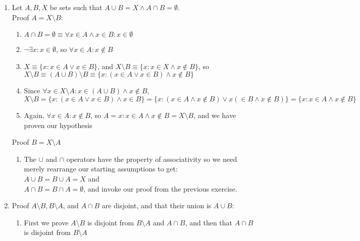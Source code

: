 \documentclass{article}
\begin{document}
\begin{enumerate}
\begin{enumerate}
            \end{enumerate}
        \item Let $A, B, X$ be sets such that $A \cup B = X \land A \cap B = \emptyset$. \\
            Proof $A = X \setminus B$:
            \begin{enumerate}
                \item $A \cap B = \emptyset \equiv \forall x \in A \land x \in B: x \in \emptyset$
                \item $\neg\exists x : x \in \emptyset$, so $\forall x \in A: x \notin B$
                \item $X \equiv \{x : x \in A \lor x \in B\}$, and $X \setminus B \equiv \{x : x \in X \land x \notin B\}$, so
                    $X \setminus B \equiv (A \cup B) \setminus B \equiv \{x : (x \in A \lor x \in B) \land x \notin B\}$
                \item Since $\forall x \in X \setminus A: x \in (A \cup B) \land x
                    \notin B$, $X \setminus B = \{x : (x \in A \lor x \in B) \land x \in
                    B\} = \{x: (x \in A \land x \notin B) \lor x (\in B \land x
                    \notin B)\} = \{x: x \in A \land x \notin B\}$
                \item Again, $\forall x \in A: x \notin B$, so $A = {x: x \in A \land x \notin B} = X \setminus B$,
                    and we have proven our hypothesis
            \end{enumerate}
            Proof $B = X \setminus A$
            \begin{enumerate}
                \item The $\cup$ and $\cap$ operators have the property of associativity so we need merely rearrange our
                    starting assumptions to get: \\
                    $A \cup B = B \cup A = X$ and \\
                    $A \cap B = B \cap A = \emptyset$, and invoke our proof from the previous exercise.
            \end{enumerate}
        \item Proof $A \setminus B, B \setminus A$, and $A \cap B$ are disjoint, and that their union is $A \cup B$:
            \begin{enumerate}
                \item First we prove $A \setminus B$ is disjoint from $B
                    \setminus A$ and $A \cap B$, and then that $A \cap B$ is
                    disjoint from $B \setminus A$

\end{enumerate}
\end{enumerate}
\end{document}
